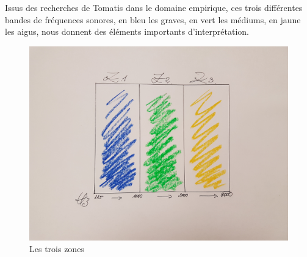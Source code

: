 Issus des recherches de Tomatis dans le domaine
empirique, ces trois différentes bandes de fréquences sonores, en bleu les graves, en vert les médiums, 
en jaune les aigus,  nous donnent des éléments importants 
d'interprétation.
\begin{figure}
	\centering
	\includegraphics[width=0.5\linewidth]{images/les3zones.jpg}
	\caption[Les 3 zones]{Les trois zones}
	\label{Les trois zones du test d'écoute}
\end{figure}


